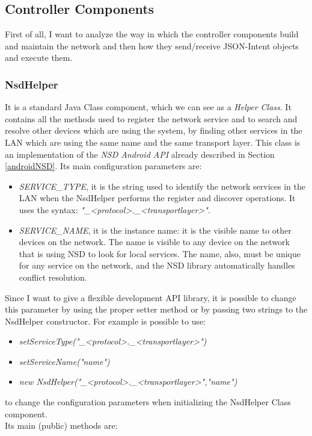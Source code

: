 \subsection{Controller Components}
First of all, I want to analyze the way in which the controller components build and maintain the network and then how they send/receive JSON-Intent objects and execute them.\\
\subsubsection{NsdHelper}
It is a standard Java Class component, which we can see as a \textit{Helper Class}. It contains all the methods used to register the network service and to search and resolve other devices which are using the system, by finding other services in the LAN which are using the same name and the same transport layer. This class is an implementation of the \textit{NSD Android API} already described in Section \ref{androidNSD}.
Its main configuration parameters are:
\begin{itemize}
	\item \textit{SERVICE\_TYPE}, it is the string used to identify the network services in the LAN when the NsdHelper performs the register and discover operations. It uses the syntax: \textit{"\_<protocol>.\_<transportlayer>"}. 
	\item \textit{SERVICE\_NAME}, it is the instance name: it is the visible name to other devices on the network. The name is visible to any device on the network that is using NSD to look for local services. The name, also, must be unique for any service on the network, and the NSD library automatically handles conflict resolution.
\end{itemize}
 Since I want to give a flexible development API library, it is possible to change this parameter by using the proper setter method or by passing two strings to the NsdHelper constructor. For example is possible to use:
 \begin{itemize}
 	\item \textit{setServiceType("\_<protocol>.\_<transportlayer>")}
 	\item \textit{setServiceName("name")}
 	\item \textit{new NsdHelper("\_<protocol>.\_<transportlayer>","name")} 
 \end{itemize} to change the configuration parameters when initializing the NsdHelper Class component.\\
Its main (public) methods are:
